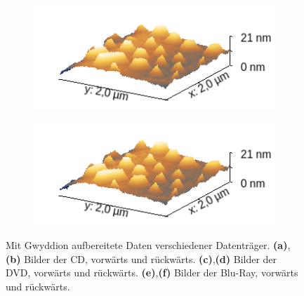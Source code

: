 \begin{figure}[H]
\begin{subfigure}{0.49\textwidth}
        \caption{}
    \end{subfigure}
    \begin{subfigure}{0.49\textwidth}
        \includegraphics[width=\textwidth]{bilder/CD,DVD,Blu-Ray/Blu-Ray_s.png}
        \caption{}
    \end{subfigure}
    \begin{subfigure}{0.49\textwidth}
        \includegraphics[width=\textwidth]{bilder/CD,DVD,Blu-Ray/Blu-Ray_Bac_s.png}
        \caption{}
    \end{subfigure}
    \caption{Mit Gwyddion aufbereitete Daten verschiedener Datenträger. \textbf{(a)},\textbf{(b)} Bilder der CD, vorwärts und rückwärts. \textbf{(c)},\textbf{(d)} Bilder der DVD, vorwärts und rückwärts. \textbf{(e)},\textbf{(f)} Bilder der Blu-Ray, vorwärts und rückwärts.}
    \label{fig:CD_A}
\end{figure}

